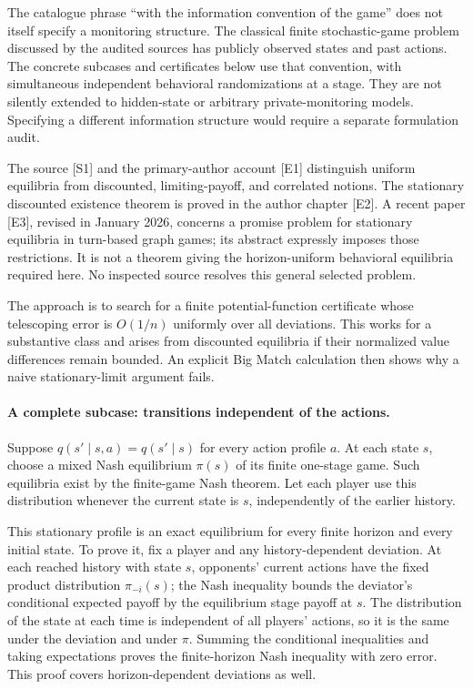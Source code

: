 \documentclass[11pt]{article}
\begin{document}
The catalogue phrase ``with the information convention of the game''
does not itself specify a monitoring structure. The classical finite
stochastic-game problem discussed by the audited sources has publicly
observed states and past actions. The concrete subcases and certificates
below use that convention, with simultaneous independent behavioral
randomizations at a stage. They are not silently extended to hidden-state
or arbitrary private-monitoring models. Specifying a different information
structure would require a separate formulation audit.

The source [S1] and the primary-author account [E1] distinguish uniform
equilibria from discounted, limiting-payoff, and correlated notions.
The stationary discounted existence theorem is proved in the author
chapter [E2]. A recent paper [E3], revised in January 2026, concerns a
promise problem for stationary equilibria in turn-based graph games;
its abstract expressly imposes those restrictions. It is not a theorem
giving the horizon-uniform behavioral equilibria required here. No
inspected source resolves this general selected problem.

The approach is to search for a finite potential-function certificate
whose telescoping error is $O(1/n)$ uniformly over all deviations. This
works for a substantive class and arises from discounted equilibria if
their normalized value differences remain bounded. An explicit Big Match
calculation then shows why a naive stationary-limit argument fails.

\paragraph{A complete subcase: transitions independent of the actions.}
Suppose $q(s'\mid s,a)=q(s'\mid s)$ for every action profile $a$.
At each state $s$, choose a mixed Nash equilibrium $\pi(s)$ of its finite
one-stage game. Such equilibria exist by the finite-game Nash theorem.
Let each player use this distribution whenever the current state is $s$,
independently of the earlier history.

This stationary profile is an exact equilibrium for every finite horizon
and every initial state. To prove it, fix a player and any history-dependent
deviation. At each reached history with state $s$, opponents' current
actions have the fixed product distribution $\pi_{-i}(s)$; the Nash
inequality bounds the deviator's conditional expected payoff by the
equilibrium stage payoff at $s$. The distribution of the state at each
time is independent of all players' actions, so it is the same under
the deviation and under $\pi$. Summing the conditional inequalities
and taking expectations proves the finite-horizon Nash inequality with
zero error. This proof covers horizon-dependent deviations as well.
\end{document}
